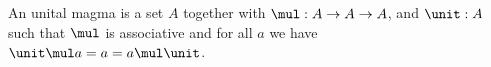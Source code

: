 \begin{theory}
   An unital magma is a set $A$
   together with $\mul : A\to A\to A$,
   and $\unit : A$
   such that $\mul$ is associative
   and for all $a$ we have $\unit\mul a = a = a\mul\unit$.
\end{theory}
